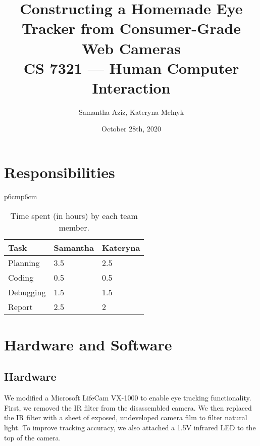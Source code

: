 \documentclass[11pt]{article}
\begin{document}
\title{Constructing a Homemade Eye Tracker from Consumer-Grade Web Cameras \\ CS 7321 — Human Computer Interaction}
\author{Samantha Aziz, Kateryna Melnyk}  %
\date{October 28th, 2020}
\maketitle

\section{Responsibilities}
\label{sec:responsibilities} %

    \begin{table}[h!]
        \begin{center}
        \begin{tabular}{p{6cm}p{6cm}}
            \begin{tabular}{lll}
            \toprule
            Task & Samantha & Kateryna \\
            \midrule
            Planning & 3.5 & 2.5 \\
            \midrule
            Coding & 0.5 & 0.5 \\
            \midrule
            Debugging & 1.5 & 1.5 \\
            \midrule
            Report & 2.5 & 2 \\
            \bottomrule
            \end{tabular}
        \end{tabular}
        \caption{Time spent (in hours) by each team member.}
        \end{center}
        \label{tab:table_repsonsibilities}
    \end{table}

\section{Hardware and Software}
\label{sec:hardware-and-software} %

\label{setup}
\subsection{Hardware}
\label{subsec:hardware}
We modified a Microsoft LifeCam VX-1000 to enable eye tracking functionality.
First, we removed the IR filter from the disassembled camera.
We then replaced the IR filter with a sheet of exposed, undeveloped camera film
to filter natural light.
To improve tracking accuracy, we also attached a 1.5V infrared LED to the top of
the camera. \\
\end{document}
